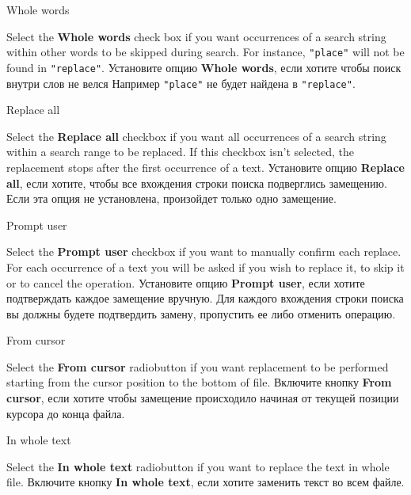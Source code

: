 \begin{popup}
\caption{Whole words}

\ifenglish
Select the {\bf Whole words} check box if you want occurrences of a search
string within other words to be skipped during search. For instance,
{\tt "place"} will not be found in {\tt "replace"}.
\else
Установите опцию {\bf Whole words}, если хотите чтобы поиск внутри слов не велся Например
{\tt "place"} не будет найдена в {\tt "replace"}.
\fi
\end{popup}

\begin{popup}
\caption{Replace all}

\ifenglish
Select the {\bf Replace all} checkbox if you want all occurrences of a search
string within a search range to be replaced. If this checkbox isn't selected,
the replacement stops after the first occurrence of a text.
\else
Установите опцию {\bf Replace all}, если хотите, чтобы все вхождения строки поиска
подверглись замещению. Если эта опция не установлена, произойдет только 
одно замещение.
\fi
\end{popup}

\begin{popup}
\caption{Prompt user}

\ifenglish
Select the {\bf Prompt user} checkbox if you want to manually confirm each
replace. For each occurrence of a text you will be asked if you wish to 
replace it, to skip it or to cancel the operation.
\else
Установите опцию {\bf Prompt user}, если хотите подтверждать каждое замещение 
вручную. Для каждого вхождения строки поиска вы должны будете подтвердить
замену, пропустить ее либо отменить операцию.
\fi
\end{popup}

\begin{popup}
\caption{From cursor}

\ifenglish
Select the {\bf From cursor} radiobutton if you want replacement to be performed
starting from the cursor position to the bottom of file.
\else
Включите кнопку {\bf From cursor}, если хотите чтобы замещение происходило 
начиная от текущей позиции курсора до конца файла.
\fi
\end{popup}

\begin{popup}
\caption{In whole text}

\ifenglish
Select the {\bf In whole text} radiobutton if you want to replace the text in whole
file.
\else
Включите кнопку {\bf In whole text}, если хотите заменить текст во всем файле.
\fi
\end{popup}

